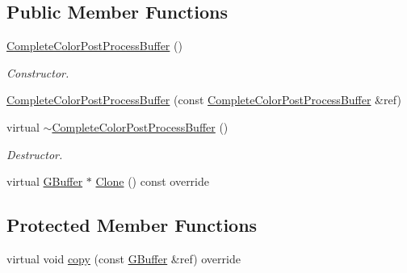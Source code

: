 \subsection*{Public Member Functions}
\begin{DoxyCompactItemize}
\item 
\mbox{\label{class_geometry_engine_1_1_geometry_buffer_1_1_complete_color_post_process_buffer_a7389da9d8218edf267649b7a10d29ce0}} 
\mbox{\hyperlink{class_geometry_engine_1_1_geometry_buffer_1_1_complete_color_post_process_buffer_a7389da9d8218edf267649b7a10d29ce0}{Complete\+Color\+Post\+Process\+Buffer}} ()
\begin{DoxyCompactList}\small\item\em Constructor. \end{DoxyCompactList}\item 
\mbox{\hyperlink{class_geometry_engine_1_1_geometry_buffer_1_1_complete_color_post_process_buffer_a7cce9b235baaf2d45b0a6e23c80a46e8}{Complete\+Color\+Post\+Process\+Buffer}} (const \mbox{\hyperlink{class_geometry_engine_1_1_geometry_buffer_1_1_complete_color_post_process_buffer}{Complete\+Color\+Post\+Process\+Buffer}} \&ref)
\item 
\mbox{\label{class_geometry_engine_1_1_geometry_buffer_1_1_complete_color_post_process_buffer_a17565c4189eb41f7d1ef0193bbeb9d53}} 
virtual \mbox{\hyperlink{class_geometry_engine_1_1_geometry_buffer_1_1_complete_color_post_process_buffer_a17565c4189eb41f7d1ef0193bbeb9d53}{$\sim$\+Complete\+Color\+Post\+Process\+Buffer}} ()
\begin{DoxyCompactList}\small\item\em Destructor. \end{DoxyCompactList}\item 
virtual \mbox{\hyperlink{class_geometry_engine_1_1_geometry_buffer_1_1_g_buffer}{G\+Buffer}} $\ast$ \mbox{\hyperlink{class_geometry_engine_1_1_geometry_buffer_1_1_complete_color_post_process_buffer_a8a484d5196bba7b92f31e500229743bc}{Clone}} () const override
\end{DoxyCompactItemize}
\subsection*{Protected Member Functions}
\begin{DoxyCompactItemize}
\item 
virtual void \mbox{\hyperlink{class_geometry_engine_1_1_geometry_buffer_1_1_complete_color_post_process_buffer_ac7d1a90658b1a2f59674b76685e8b052}{copy}} (const \mbox{\hyperlink{class_geometry_engine_1_1_geometry_buffer_1_1_g_buffer}{G\+Buffer}} \&ref) override
\end{DoxyCompactItemize}

